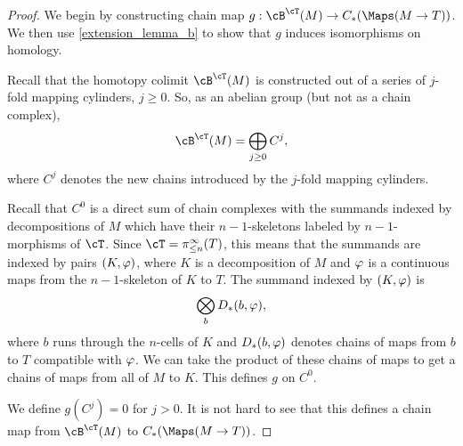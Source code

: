 \begin{proof}
We begin by constructing chain map $g: \cB^\cT(M) \to C_*(\Maps(M\to T))$.
We then use \ref{extension_lemma_b} to show that $g$ induces isomorphisms on homology.

Recall that the homotopy colimit $\cB^\cT(M)$ is constructed out of a series of
$j$-fold mapping cylinders, $j \ge 0$.
So, as an abelian group (but not as a chain complex), 
\[
	\cB^\cT(M) = \bigoplus_{j\ge 0} C^j,
\]
where $C^j$ denotes the new chains introduced by the $j$-fold mapping cylinders.

Recall that $C^0$ is a direct sum of chain complexes with the summands indexed by
decompositions of $M$ which have their $n{-}1$-skeletons labeled by $n{-}1$-morphisms
of $\cT$.
Since $\cT = \pi^\infty_{\leq n}(T)$, this means that the summands are indexed by pairs
$(K, \varphi)$, where $K$ is a decomposition of $M$ and $\varphi$ is a continuous
maps from the $n{-}1$-skeleton of $K$ to $T$.
The summand indexed by $(K, \varphi)$ is
\[
	\bigotimes_b D_*(b, \varphi),
\]
where $b$ runs through the $n$-cells of $K$ and $D_*(b, \varphi)$ denotes
chains of maps from $b$ to $T$ compatible with $\varphi$.
We can take the product of these chains of maps to get a chains of maps from
all of $M$ to $K$.
This defines $g$ on $C^0$.

We define $g(C^j) = 0$ for $j > 0$.
It is not hard to see that this defines a chain map from 
$\cB^\cT(M)$ to $C_*(\Maps(M\to T))$.








\end{proof}

